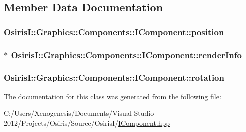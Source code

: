 \subsection{Member Data Documentation}
\hypertarget{class_osiris_i_1_1_graphics_1_1_components_1_1_i_component_a2230b1776977acacc269c7adb4beb3bf}{
\subsubsection[{position}]{ Osiris\-I\-::\-Graphics\-::\-Components\-::\-I\-Component\-::position\hspace{0.3cm}{\ttfamily [protected]}}}\label{class_osiris_i_1_1_graphics_1_1_components_1_1_i_component_a2230b1776977acacc269c7adb4beb3bf}
\hypertarget{class_osiris_i_1_1_graphics_1_1_components_1_1_i_component_a0306ee950e9f04b43f09c23821ca35f8}{
\subsubsection[{render\-Info}]{$\ast$ Osiris\-I\-::\-Graphics\-::\-Components\-::\-I\-Component\-::render\-Info\hspace{0.3cm}{\ttfamily [protected]}}}\label{class_osiris_i_1_1_graphics_1_1_components_1_1_i_component_a0306ee950e9f04b43f09c23821ca35f8}
\hypertarget{class_osiris_i_1_1_graphics_1_1_components_1_1_i_component_a0eac7cc547b49676636ef5986539ae4f}{
\subsubsection[{rotation}]{ Osiris\-I\-::\-Graphics\-::\-Components\-::\-I\-Component\-::rotation\hspace{0.3cm}{\ttfamily [protected]}}}\label{class_osiris_i_1_1_graphics_1_1_components_1_1_i_component_a0eac7cc547b49676636ef5986539ae4f}


The documentation for this class was generated from the following file\-:\begin{DoxyCompactItemize}
\item 
C\-:/\-Users/\-Xenogenesis/\-Documents/\-Visual Studio 2012/\-Projects/\-Osiris/\-Source/\-Osiris\-I/\hyperlink{_i_component_8hpp}{I\-Component.\-hpp}\end{DoxyCompactItemize}
